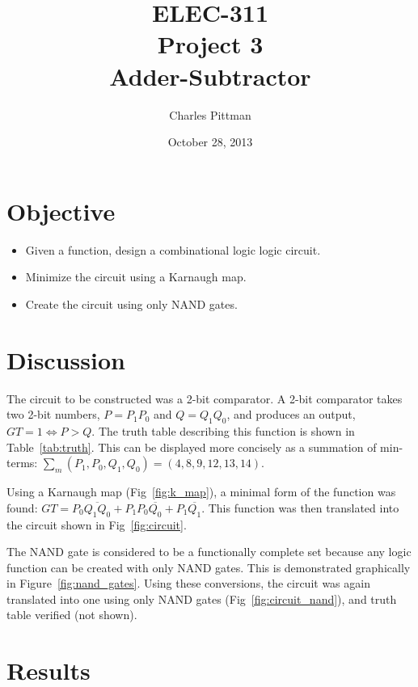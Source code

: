 \documentclass{article}
\author{Charles Pittman}
\title{ELEC-311\\ Project 3\\ Adder-Subtractor}
\date{October 28, 2013}
\begin{document}
\maketitle %

\pagebreak


\section{Objective}
\label{sec:objective}

\begin{itemize}
\item Given a function, design a combinational logic logic circuit.
\item Minimize the circuit using a Karnaugh map.
\item Create the circuit using only NAND gates.
\end{itemize}

\section{Discussion}
\label{sec:procedure}

The circuit to be constructed was a 2-bit comparator.  A 2-bit comparator takes two 2-bit numbers, $P = P_1P_0$ and $Q = Q_1Q_0$, and produces an output, $GT=1 \iff P>Q$.  The truth table describing this function is shown in Table~\ref{tab:truth}.  This can be displayed more concisely as a summation of min-terms: $\sum_m(P_1, P_0, Q_1, Q_0) = (4, 8, 9, 12, 13,14)$.

Using a Karnaugh map (Fig~\ref{fig:k_map}), a minimal form of the
function was found: $GT = P_0 \overline{Q_1 Q_0} + P_1 P_0
\overline{Q_0} + P_1 \overline{Q_1}$.  This function was then
translated into the circuit shown in Fig~\ref{fig:circuit}.

The NAND gate is considered to be a functionally complete set because any logic function can be created with only NAND gates.  This is demonstrated graphically in Figure~\ref{fig:nand_gates}.  Using these conversions, the circuit was again translated into one using only NAND gates (Fig~\ref{fig:circuit_nand}), and truth table verified (not shown).

\section{Results}
\label{sec:results}
\end{document}
